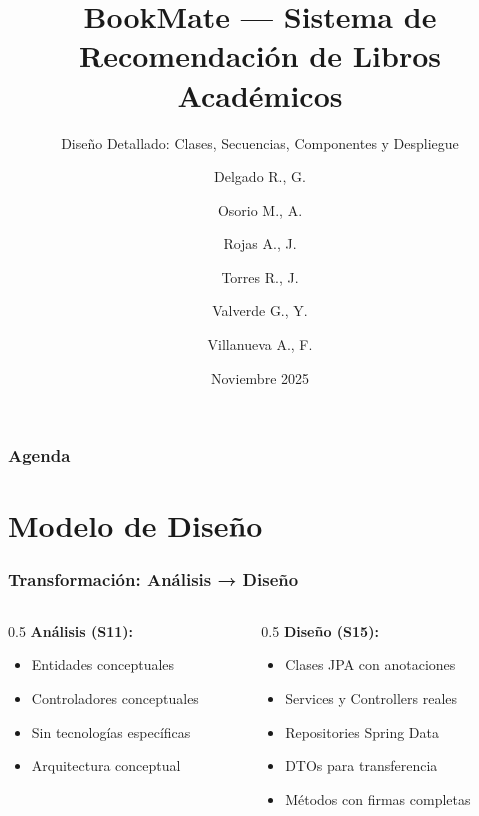\documentclass[aspectratio=169]{beamer}
\title[BookMate]{BookMate — Sistema de Recomendación de Libros Académicos}
\subtitle{Diseño Detallado: Clases, Secuencias, Componentes y Despliegue}
\author[GRUPO 6]{Delgado R., G. \and Osorio M., A. \and Rojas A., J. \and Torres R., J. \and Valverde G., Y. \and Villanueva A., F.}
\institute[FC-UNI]{UNIVERSIDAD NACIONAL DE INGENIERÍA}
\date{Noviembre 2025}
\begin{document}
\begin{frame}
\titlepage
\end{frame}

\begin{frame}
\frametitle{Agenda}
\tableofcontents
\end{frame}

\section{Modelo de Diseño}

\begin{frame}
\frametitle{Transformación: Análisis → Diseño}

\begin{columns}
\begin{column}{0.5\textwidth}
\textbf{Análisis (S11):}
\begin{itemize}
\item Entidades conceptuales
\item Controladores conceptuales
\item Sin tecnologías específicas
\item Arquitectura conceptual
\end{itemize}
\end{column}

\begin{column}{0.5\textwidth}
\textbf{Diseño (S15):}
\begin{itemize}
\item Clases JPA con anotaciones
\item Services y Controllers reales
\item Repositories Spring Data
\item DTOs para transferencia
\item Métodos con firmas completas
\end{itemize}
\end{column}
\end{columns}

\vspace{0.5cm}

\begin{center}
\end{center}

\end{frame}
\end{document}
